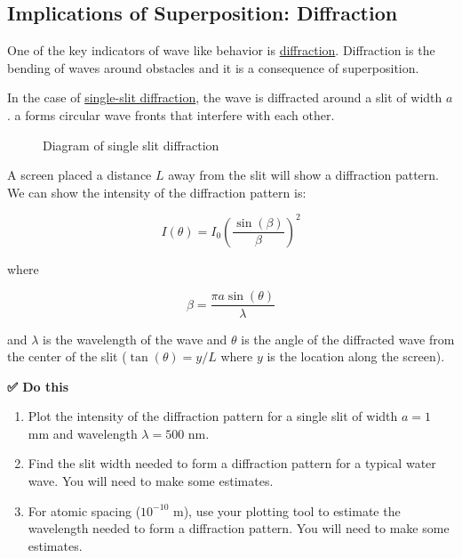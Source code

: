 \begin{Shaded}
\begin{Highlighting}[]

\end{Highlighting}
\end{Shaded}

\subsection{Implications of Superposition:
Diffraction}\label{implications-of-superposition-diffraction}

One of the key indicators of wave like behavior is
\href{https://en.wikipedia.org/wiki/Diffraction}{diffraction}.
Diffraction is the bending of waves around obstacles and it is a
consequence of superposition.

In the case of
\href{https://en.wikipedia.org/wiki/Diffraction\#Single-slit_diffraction}{single-slit
diffraction}, the wave is diffracted around a slit of width \(a\). a
forms circular wave fronts that interfere with each other.

\begin{figure}
\centering
{}
\caption{Diagram of single slit diffraction}
\end{figure}

A screen placed a distance \(L\) away from the slit will show a
diffraction pattern. We can show the intensity of the diffraction
pattern is:

\[I(\theta) = I_0\left(\dfrac{\sin(\beta)}{\beta}\right)^2\]

where

\[\beta = \dfrac{\pi a \sin(\theta)}{\lambda}\]

and \(\lambda\) is the wavelength of the wave and \(\theta\) is the
angle of the diffracted wave from the center of the slit
(\(\tan(\theta) = y/L\) where \(y\) is the location along the screen).

\textbf{✅ Do this}

\begin{enumerate}
\def\labelenumi{\arabic{enumi}.}
\tightlist
\item
  Plot the intensity of the diffraction pattern for a single slit of
  width \(a=1\) mm and wavelength \(\lambda=500\) nm.
\item
  Find the slit width needed to form a diffraction pattern for a typical
  water wave. You will need to make some estimates.
\item
  For atomic spacing (\(10^{-10}\) m), use your plotting tool to
  estimate the wavelength needed to form a diffraction pattern. You will
  need to make some estimates.
\end{enumerate}

\begin{Shaded}
\begin{Highlighting}[]
\end{Highlighting}
\end{Shaded}

\begin{Shaded}
\begin{Highlighting}[]

\end{Highlighting}
\end{Shaded}

